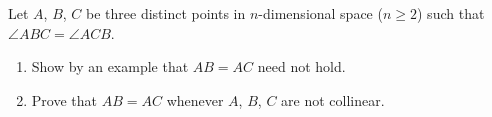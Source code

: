 Let $A$, $B$, $C$ be three distinct points in $n$-dimensional space ($n\ge2$) such that $\angle ABC=\angle ACB$.
\begin{enumerate}
\item[(a)] Show by an example that $AB=AC$ need not hold.
\item[(b)] Prove that $AB=AC$ whenever $A$, $B$, $C$ are not collinear.
\end{enumerate}
